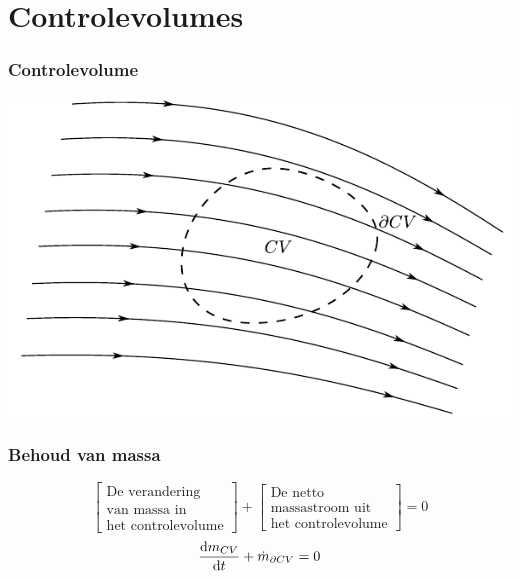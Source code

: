 \documentclass[t]{beamer}
\begin{document}
  	\section{Controlevolumes}	
  	\begin{frame}
		\frametitle{Controlevolume}
		\center
		\includegraphics{fig/controlevolumes/Controlevolume_met_stroomlijnen}
  	\end{frame}
  	\begin{frame}
		\frametitle{Behoud van massa}
		\vspace{1cm}
		\begin{equation*}
			\left[
				\begin{array}{c}
					\mbox{De verandering} \\ \mbox{van massa in} \\ \mbox{het controlevolume}
				\end{array}
			\right]
			+
			\left[
				\begin{array}{c}
					\mbox{De netto} \\ \mbox{massastroom uit} \\ \mbox{het controlevolume}
				\end{array}
			\right]
			= 0
		\end{equation*}
		\vspace{1cm}
		\pause
		\begin{equation*}
			\frac{\mathrm{d} m_{CV}}{\mathrm{d} t} + \dot{m}_{\partial CV} = 0
		\end{equation*}
	\end{frame}	
\end{document}
